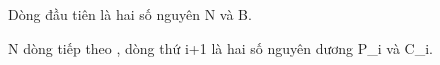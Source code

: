 Dòng đầu tiên là hai số nguyên N và B.

N dòng tiếp theo , dòng thứ i+1 là hai số nguyên dương P\_i và C\_i.